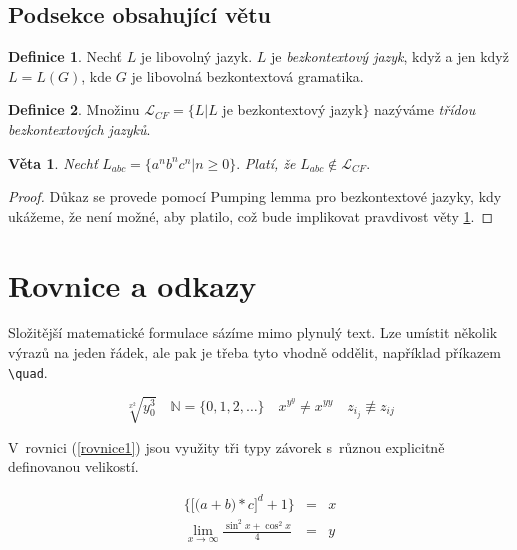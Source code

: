 \documentclass[czech,a4paper,twocolumn,11pt]{article}
\theoremstyle{definition}
\newtheorem{definice}{Definice}[section]
\theoremstyle{definition}
\theoremstyle{definition}
\newtheorem{veta}{Věta}
\begin{document}
\subsection{Podsekce obsahující větu}
\begin{definice} \hspace{0.0mm}
Nechť $L$ je libovolný jazyk. $L$ je \emph{bezkontextový jazyk}, když a jen když $L=L(G)$, kde $G$ je libovolná bezkontextová gramatika.
\end{definice}

\begin{definice} \hspace{0.0mm}
Množinu $\mathcal{L}_{CF}=\{L|L $ je bezkontextový jazyk$\}$ nazýváme \emph{třídou bezkontextových jazyků}.
\end{definice}

\begin{veta} \hspace{-1.0mm}
\label{veta1} \emph{Nechť} $L_{abc}=\{a^nb^nc^n|n \geq 0\}$. \emph{Platí, že} $L_{abc} \notin \mathcal{L}_{CF}$.
\end{veta}

\begin{proof}
Důkaz se provede pomocí Pumping lemma pro bezkontextové jazyky, kdy ukážeme, že není možné, aby platilo, což bude implikovat pravdivost věty \ref{veta1}.
\end{proof}

\section{Rovnice a odkazy}

Složitější matematické formulace sázíme mimo plynulý text. Lze umístit několik výrazů na jeden řádek, ale pak je třeba tyto vhodně oddělit, například příkazem \verb|\quad|. 


$$\sqrt[x^2]{y^3_0}\quad \mathbb {N}=\{0,1,2,\ldots\} \quad x^{y^y} \neq x^{yy} \quad z_{i_j} \not\equiv z_{ij}$$


V~rovnici (\ref{rovnice1}) jsou využity tři typy závorek s~různou explicitně definovanou velikostí.

\begin{eqnarray}
\bigg\{\Big[\big(a+b\big)*c \Big]^d+1\bigg\} &=& x  \label{rovnice1} \\
\lim\limits_{x \to \infty} \frac{\sin^2x + \cos^2x}{4} &=& y \nonumber 
\end{eqnarray}
\end{document}
